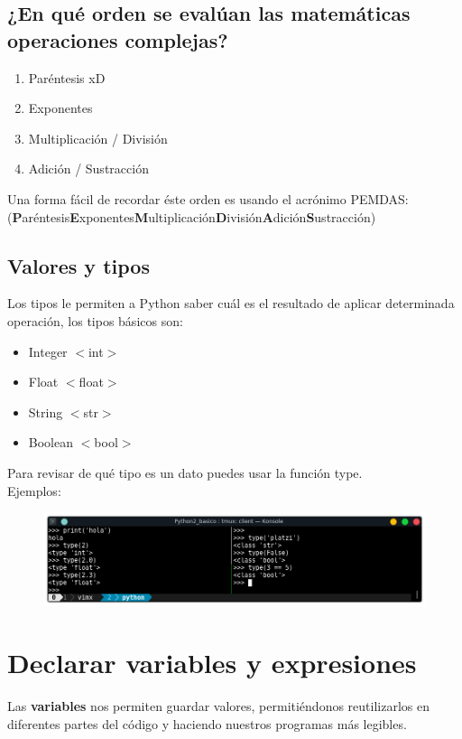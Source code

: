 \documentclass{article}
\begin{document}
\subsection{¿En qué orden se evalúan las matemáticas operaciones complejas?}%

\begin{enumerate}
  \item Paréntesis xD
  \item Exponentes
  \item Multiplicación / División
  \item Adición / Sustracción
\end{enumerate}

Una forma fácil de recordar éste orden es usando el acrónimo PEMDAS:\\
(\textbf{P}aréntesis\textbf{E}xponentes\textbf{M}ultiplicación\textbf{D}ivisión\textbf{A}dición\textbf{S}ustracción)

\subsection{Valores y tipos}%
Los tipos le permiten a Python saber cuál es el resultado de aplicar
determinada operación, los tipos básicos son:

\begin{itemize}
  \item Integer $<$int$>$
  \item Float $<$float$>$
  \item String $<$str$>$
  \item Boolean $<$bool$>$
\end{itemize}

Para revisar de qué tipo es un dato puedes usar la función type.\\

Ejemplos:

\begin{figure}[h!]
  \centering
  \includegraphics[scale=0.75]{./Pictures/013_tipos_datos.png}
\end{figure}

\newpage

\section{Declarar variables y expresiones}%
Las \textbf{variables} nos permiten guardar valores, permitiéndonos
reutilizarlos en diferentes partes del código y haciendo nuestros programas más
legibles.\\
\end{document}
